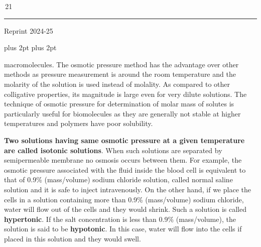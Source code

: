 \documentclass[11pt,a4paper]{article}
\renewcommand{\normalsize}{\fontsize{10.5bp}{12.7bp}\selectfont\abovedisplayskip=4pt plus 2pt\belowdisplayskip=4pt plus 2pt\abovedisplayshortskip=2pt\belowdisplayshortskip=2pt}
\begin{document}
\vfill
\noindent\hfill\begin{minipage}{0.33\textwidth}
\colorbox{Goldenrod1}{\color{gray}\,21\,}\\[-6pt]
{\color{Goldenrod1}\rule{\linewidth}{1pt}}
\end{minipage}
\begin{center}
{\sffamily\small Reprint 2024-25}
\end{center}

\normalsize


\noindent\hfill\begin{minipage}[t]{0.735\textwidth}
macromolecules. The osmotic pressure method has the advantage over other methods as pressure measurement is around the room temperature and the molarity of the solution is used instead of molality. As compared to other colligative properties, its magnitude is large even for very dilute solutions. The technique of osmotic pressure for determination of molar mass of solutes is particularly useful for biomolecules as they are generally not stable at higher temperatures and polymers have poor solubility.

\hspace*{1.5em}\textbf{Two solutions having same osmotic pressure at a given temperature are called isotonic solutions}. When such solutions are separated by semipermeable membrane no osmosis occurs between them. For example, the osmotic pressure associated with the fluid inside the blood cell is equivalent to that of 0.9\% (mass/volume) sodium chloride solution, called normal saline solution and it is safe to inject intravenously. On the other hand, if we place the cells in a solution containing more than 0.9\% (mass/volume) sodium chloride, water will flow out of the cells and they would shrink. Such a solution is called \textbf{hypertonic}. If the salt concentration is less than 0.9\% (mass/volume), the solution is said to be \textbf{hypotonic}. In this case, water will flow into the cells if placed in this solution and they would swell.
\end{minipage}
\end{document}
